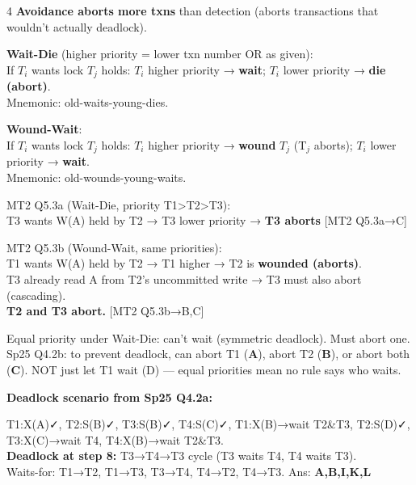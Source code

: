 \documentclass[8pt,letterpaper]{article}
\newcommand{\key}[1]{\textbf{\color{red!70!black}#1}}
\newcommand{\ans}[1]{\textbf{\color{blue!80!black}#1}}
\newcommand{\qref}[1]{{\fontsize{3.5}{4}\selectfont\color{purple!60!black}[#1]}}
\begin{document}
\begin{multicols*}{4}
\key{Avoidance aborts more txns} than detection (aborts transactions that wouldn't actually deadlock).

\key{Wait-Die} (higher priority = lower txn number OR as given):\\
If $T_i$ wants lock $T_j$ holds: $T_i$ higher priority → \textbf{wait}; $T_i$ lower priority → \textbf{die (abort)}.\\
Mnemonic: old-waits-young-dies.

\key{Wound-Wait}:\\
If $T_i$ wants lock $T_j$ holds: $T_i$ higher priority → \textbf{wound} $T_j$ (T$_j$ aborts); $T_i$ lower priority → \textbf{wait}.\\
Mnemonic: old-wounds-young-waits.

\begin{ansbox}
MT2 Q5.3a (Wait-Die, priority T1>T2>T3):\\
T3 wants W(A) held by T2 → T3 lower priority → \ans{T3 aborts} \qref{MT2 Q5.3a→C}
\end{ansbox}

\begin{ansbox}
MT2 Q5.3b (Wound-Wait, same priorities):\\
T1 wants W(A) held by T2 → T1 higher → T2 is \textbf{wounded (aborts)}.\\
T3 already read A from T2's uncommitted write → T3 must also abort (cascading).\\
\ans{T2 and T3 abort.} \qref{MT2 Q5.3b→B,C}
\end{ansbox}

\begin{ansbox}
Equal priority under Wait-Die: can't wait (symmetric deadlock). Must abort one.\\
Sp25 Q4.2b: to prevent deadlock, can abort T1 (\textbf{A}), abort T2 (\textbf{B}), or abort both (\textbf{C}). NOT just let T1 wait (D) — equal priorities mean no rule says who waits.
\end{ansbox}

\key{Deadlock scenario from Sp25 Q4.2a:}
\begin{ansbox}
T1:X(A)✓, T2:S(B)✓, T3:S(B)✓, T4:S(C)✓, T1:X(B)→wait T2\&T3, T2:S(D)✓, T3:X(C)→wait T4, T4:X(B)→wait T2\&T3.\\
\textbf{Deadlock at step 8:} T3→T4→T3 cycle (T3 waits T4, T4 waits T3).\\
Waits-for: T1→T2, T1→T3, T3→T4, T4→T2, T4→T3. Ans: \ans{A,B,I,K,L}
\end{ansbox}


\end{multicols*}
\end{document}
